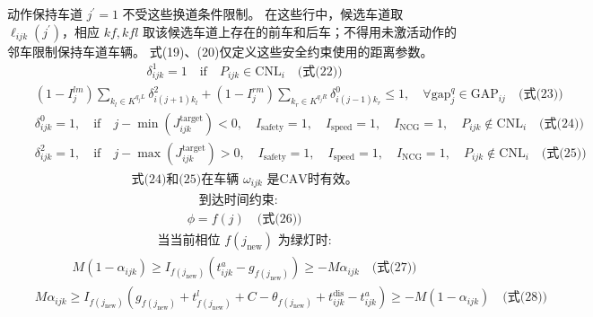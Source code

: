 \documentclass[UTF8,11pt]{ctexart}
\begin{document}
动作保持车道 $j^{\prime}=1$ 不受这些换道条件限制。
在这些行中，候选车道取 $\ell_{ijk}(j^{\prime})$，相应 $kf,kfl$
取该候选车道上存在的前车和后车；不得用未激活动作的邻车限制保持车道车辆。
式(19)、(20)仅定义这些安全约束使用的距离参数。
\[\begin{aligned}&\quad \delta^{1}_{ijk} = 1 \quad \text{if} \quad P_{ijk} \in \text{CNL}_{i} \quad \text{(式(22))}\end{aligned}\]
\[\begin{aligned}&\quad (1 - I^{lm}_{j}) \sum_{k_{l} \in K^{q_{j}L}} \delta^{2}_{i(j+1)k_l} + (1 - I^{rm}_{j}) \sum_{k_{r} \in K^{q_{j}R}} \delta^{0}_{i(j-1)k_r} \leq 1, \quad \forall \text{gap}^{q}_{j} \in \text{GAP}_{ij} \quad \text{(式(23))}\end{aligned}\]
\[\begin{aligned}&\quad \delta^{0}_{ijk} = 1, \quad \text{if} \quad j - \min(J^{\text{target}}_{ijk}) < 0, \quad I_{\text{safety}} = 1, \quad I_{\text{speed}} = 1, \quad I_{\text{NCG}} = 1, \quad P_{ijk} \notin \text{CNL}_{i} \quad \text{(式(24))}\end{aligned}\]
\[\begin{aligned}&\quad \delta^{2}_{ijk} = 1, \quad \text{if} \quad j - \max(J^{\text{target}}_{ijk}) > 0, \quad I_{\text{safety}} = 1, \quad I_{\text{speed}} = 1, \quad I_{\text{NCG}} = 1, \quad P_{ijk} \notin \text{CNL}_{i} \quad \text{(式(25))}\end{aligned}\]
\[\begin{aligned}&\quad \text{式(24)和(25)在车辆 } \omega_{ijk} \text{ 是CAV时有效。}\end{aligned}\]
\[\begin{aligned}&\text{到达时间约束:}\end{aligned}\]
\[\begin{aligned}&\quad \phi = f(j) \quad \text{(式(26))}\end{aligned}\]
\[\begin{aligned}&\quad \text{当当前相位 } f(j_{\text{new}}) \text{ 为绿灯时:}\end{aligned}\]
\[\begin{aligned}&\quad M(1 - \alpha_{ijk}) \geq I_{f(j_{\text{new}})}(t^{a}_{ijk} - g_{f(j_{\text{new}})}) \geq -M \alpha_{ijk} \quad \text{(式(27))}\end{aligned}\]
\[\begin{aligned}&\quad M \alpha_{ijk} \geq I_{f(j_{\text{new}})}(g_{f(j_{\text{new}})} + t^{l}_{f(j_{\text{new}})} + C - \theta_{f(j_{\text{new}})} + t^{\text{dis}}_{ijk} - t^{a}_{ijk}) \geq -M(1 - \alpha_{ijk}) \quad \text{(式(28))}\end{aligned}\]
\end{document}
